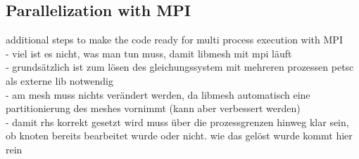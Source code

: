  \subsection{Parallelization with MPI}
 additional steps to make the code ready for multi process execution with MPI\\
 - viel ist es nicht, was man tun muss, damit libmesh mit mpi läuft\\
 - grundsätzlich ist zum lösen des gleichungssystem mit mehreren prozessen petsc als externe lib notwendig\\
 - am mesh muss nichts verändert werden, da libmesh automatisch eine partitionierung des meshes vornimmt (kann aber verbessert werden)\\
 - damit rhs korrekt gesetzt wird muss über die prozessgrenzen hinweg klar sein, ob knoten bereits bearbeitet wurde oder nicht. wie das gelöst wurde kommt hier rein\newline